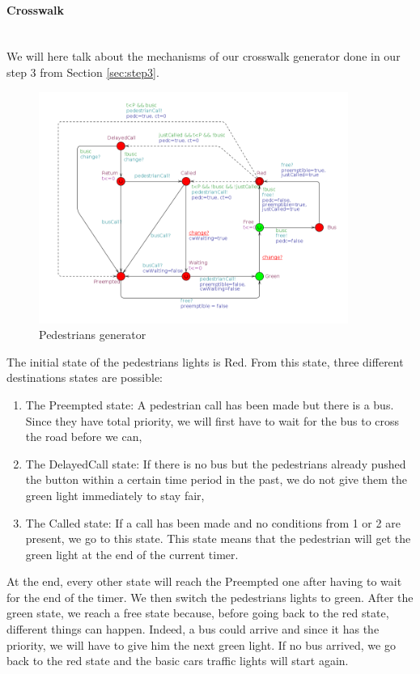 \paragraph{Crosswalk} \mbox{}\\
We will here talk about the mechanisms of our crosswalk generator done in our step 3 from Section \ref{sec:step3}. \\

\begin{figure}[H]\label{fig:crosswalk}
  \centering
    \includegraphics[width=0.9\textwidth]{picture/crosswalk.png}
    \caption{Pedestrians generator}
\end{figure}
\noindent The initial state of the pedestrians lights is Red. From this state, three different destinations states are possible:
\begin{enumerate}
  \item The Preempted state: A pedestrian call has been made but there is a bus. Since they have total priority, we will first have to wait for the bus to cross the road before we can,
  \item The DelayedCall state: If there is no bus but the pedestrians already pushed the button within a certain time period in the past, we do not give them the green light immediately to stay fair,
  \item The Called state: If a call has been made and no conditions from 1 or 2 are present, we go to this state. This state means that the pedestrian will get the green light at the end of the current timer.
\end{enumerate}
At the end, every other state will reach the Preempted one after having to wait for the end of the timer. We then switch the pedestrians lights to green. After the green state, we reach a free state because, before going back to the red state, different things can happen. Indeed, a bus could arrive and since it has the priority, we will have to give him the next green light. If no bus arrived, we go back to the red state and the basic cars traffic lights will start again. 

